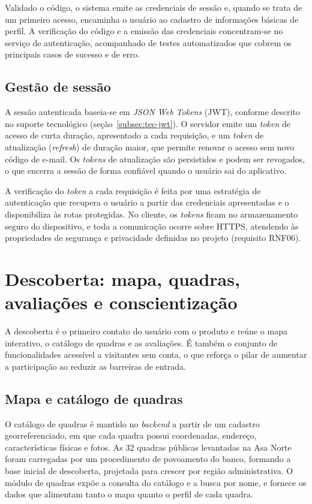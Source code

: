       Validado o código, o sistema emite as credenciais de sessão e, quando se trata de um primeiro acesso, encaminha o usuário ao cadastro de informações básicas de perfil. A verificação do código e a emissão das credenciais concentram-se no serviço de autenticação, acompanhado de testes automatizados que cobrem os principais casos de sucesso e de erro.

    \subsection{Gestão de sessão}
      A sessão autenticada baseia-se em \textit{JSON Web Tokens} (JWT), conforme descrito no suporte tecnológico (seção~\ref{subsec:tec-jwt}). O servidor emite um \textit{token} de acesso de curta duração, apresentado a cada requisição, e um \textit{token} de atualização (\textit{refresh}) de duração maior, que permite renovar o acesso sem novo código de e-mail. Os \textit{tokens} de atualização são persistidos e podem ser revogados, o que encerra a sessão de forma confiável quando o usuário sai do aplicativo.

      A verificação do \textit{token} a cada requisição é feita por uma estratégia de autenticação que recupera o usuário a partir das credenciais apresentadas e o disponibiliza às rotas protegidas. No cliente, os \textit{tokens} ficam no armazenamento seguro do dispositivo, e toda a comunicação ocorre sobre HTTPS, atendendo às propriedades de segurança e privacidade definidas no projeto (requisito RNF06).

\section{Descoberta: mapa, quadras, avaliações e conscientização}
  \label{sec:dev-descoberta}

    A descoberta é o primeiro contato do usuário com o produto e reúne o mapa interativo, o catálogo de quadras e as avaliações. É também o conjunto de funcionalidades acessível a visitantes sem conta, o que reforça o pilar de aumentar a participação ao reduzir as barreiras de entrada.

    \subsection{Mapa e catálogo de quadras}
      O catálogo de quadras é mantido no \textit{backend} a partir de um cadastro georreferenciado, em que cada quadra possui coordenadas, endereço, características físicas e fotos. As 32 quadras públicas levantadas na Asa Norte foram carregadas por um procedimento de povoamento do banco, formando a base inicial de descoberta, projetada para crescer por região administrativa. O módulo de quadras expõe a consulta do catálogo e a busca por nome, e fornece os dados que alimentam tanto o mapa quanto o perfil de cada quadra.

